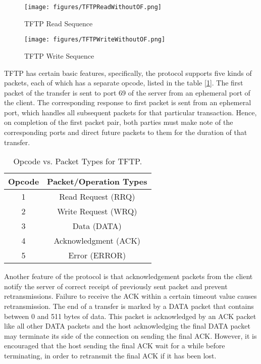 \begin{figure}
\centering
\texttt{[image: figures/TFTPReadWithoutOF.png]}
\caption{TFTP Read Sequence}
\label{fig:tftpread}
\end{figure}
\setlength{\belowcaptionskip}{0pt}

\begin{figure}[h]
\centering
\texttt{[image: figures/TFTPWriteWithoutOF.png]}
\caption{TFTP Write Sequence}
\label{fig:tftpwrite}
\end{figure}
\setlength{\belowcaptionskip}{0pt}

TFTP has certain basic features, specifically, the protocol supports five kinds of packets, each of which has a separate opcode, listed in the table [\ref{tab:opcodes}]. The first packet of the transfer is sent to port 69 of the server from an ephemeral port of the client. The corresponding response to first packet is sent from an ephemeral port, which handles all subsequent packets for that particular transaction. Hence, on completion of the first packet pair, both parties must make note of the corresponding ports and direct future packets to them for the duration of that transfer. 

\begin{table}[h]
\centering
\caption{Opcode vs. Packet Types for TFTP.}
\label{tab:opcodes}
\begin{tabular}{|c|c|}
\hline
Opcode &  Packet/Operation Types\\
\hline
1 & Read Request (RRQ)\\
\hline
2 & Write Request (WRQ)\\
\hline
3 & Data (DATA)\\
\hline
4 & Acknowledgment (ACK)\\
\hline
5 & Error (ERROR)\\
\hline
\end{tabular}
\end{table}

Another feature of the protocol is that acknowledgement packets from the client notify the server of correct receipt of previously sent packet and prevent retransmissions. Failure to receive the ACK within a certain timeout value causes retransmission. The end of a transfer is marked by a DATA packet that contains between 0 and 511 bytes of data. This packet is acknowledged by an ACK packet like all other DATA packets and the host acknowledging the final DATA packet may terminate its side of the connection on sending the final ACK.  However, it is encouraged that the host sending the final ACK wait for a while before terminating, in order to retransmit the final ACK if it has been lost.


